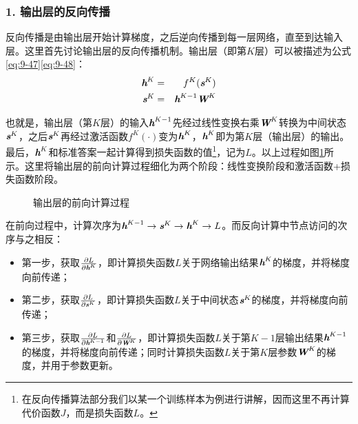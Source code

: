 
\subsubsection{1. 输出层的反向传播}

\parinterval  反向传播是由输出层开始计算梯度，之后逆向传播到每一层网络，直至到达输入层。这里首先讨论输出层的反向传播机制。输出层（即第$ K $层）可以被描述为公式\eqref{eq:9-47}\eqref{eq:9-48}：
\begin{eqnarray}
{\textbf{\em h}}^K&=&f^K({\textbf{\em s}}^K)\label{eq:9-47}\\
{\textbf{\em s}}^K&=&{\textbf{\em h}}^{K-1}{\textbf{\em W}}^K
\label{eq:9-48}
\end{eqnarray}

\noindent  也就是，输出层（第$ K $层）的输入$ {\textbf{\em h}}^{K-1} $先经过线性变换右乘${\textbf{\em W}}^K $转换为中间状态$ {\textbf{\em s}}^K $，之后${\textbf{\em s}}^K $再经过激活函数$ f^K(\cdot) $变为$ {\textbf{\em h}}^K $，$ {\textbf{\em h}}^K $即为第$ K $层（输出层）的输出。最后，$ {\textbf{\em h}}^K $和标准答案一起计算得到损失函数的值\footnote{在反向传播算法部分我们以某一个训练样本为例进行讲解，因而这里不再计算代价函数$J$，而是损失函数$L$。}，记为$ L $。以上过程如图\ref{fig:9-53}所示。这里将输出层的前向计算过程细化为两个阶段：线性变换阶段和激活函数+损失函数阶段。

\begin{figure}[htp]
\centering

\caption{输出层的前向计算过程}
\label{fig:9-53}
\end{figure}

\parinterval  在前向过程中，计算次序为${\textbf{\em h}}^{K-1}\rightarrow {\textbf{\em s}}^K\rightarrow {\textbf{\em h}}^K  \rightarrow L $。而反向计算中节点访问的次序与之相反：


\begin{itemize}
\vspace{0.5em}
\item 第一步，获取$ \frac{\partial L}{\partial {\textbf{\em h}}^K} $，即计算损失函数$ L $关于网络输出结果$ {\textbf{\em h}}^K $的梯度，并将梯度向前传递；
\vspace{0.5em}
\item 第二步，获取$ \frac{\partial L}{\partial {\textbf{\em s}}^K} $，即计算损失函数$ L $关于中间状态$ {\textbf{\em s}}^K $的梯度，并将梯度向前传递；
\vspace{0.5em}
\item 第三步，获取$ \frac{\partial L}{\partial {\textbf{\em h}}^{K-1}} $和$ \frac{\partial L}{\partial{\textbf{\em W}}^K} $，即计算损失函数$ L $关于第$ K-1 $层输出结果$ {\textbf{\em h}}^{K-1} $的梯度，并将梯度向前传递；同时计算损失函数$ L $关于第$K$层参数${\textbf{\em W}}^K $的梯度，并用于参数更新。
\vspace{0.5em}
\end{itemize}

